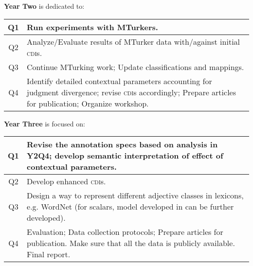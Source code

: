 \documentclass[10pt]{article}
\newcommand{\miniskip}{\vspace*{1mm}}
\begin{document}
\miniskip\noindent
{\bf Year Two} is dedicated to: 

\vspace{2mm}\noindent
{\small
\begin{tabularx}{470pt}{|c|X|}

\hline

Q1 	&  Run experiments with MTurkers. \\

\hline

Q2	& Analyze/Evaluate results of MTurker data with/against initial \textsc{cdi}s. \\

\hline

Q3	&  Continue MTurking work; Update classifications and mappings. \\

\hline

Q4	& Identify detailed contextual parameters accounting for judgment divergence; revise \textsc{cdi}s accordingly; Prepare articles for
     publication;  Organize workshop. \\
\hline

\end{tabularx}
}


\miniskip\noindent
{\bf Year Three} is focused on:  

\vspace{2mm}\noindent
{\small
\begin{tabularx}{470pt}{|c|X|}

\hline

Q1 & Revise the annotation specs based on analysis in Y2Q4; develop semantic interpretation of effect of contextual parameters. 
\\

\hline

Q2 & Develop enhanced \textsc{cdi}s.  \\

\hline

Q3 &   Design a way to represent different adjective classes in lexicons, e.g. WordNet (for scalars, model developed in \cite{sheinmanetal2013} can be further developed). \\

\hline

Q4 &  Evaluation; Data collection protocols; Prepare articles for publication. Make sure that all the data is publicly available. Final report.\\

\hline

\end{tabularx}
}
\end{document}
